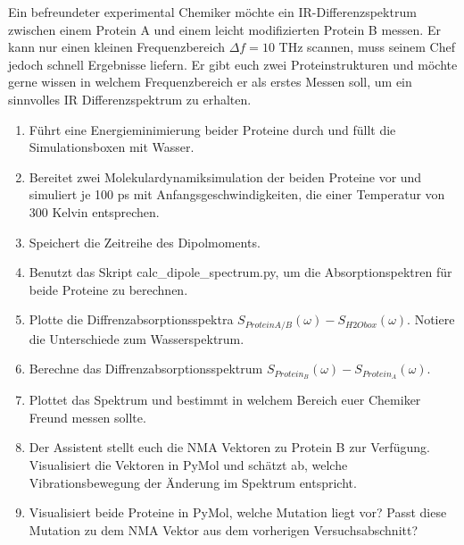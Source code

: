 \documentclass[a4paper,12pt]{article}
\begin{document}
Ein befreundeter experimental Chemiker möchte ein IR-Differenzspektrum zwischen einem Protein A und einem leicht modifizierten Protein B messen. Er
kann nur einen kleinen Frequenzbereich $\Delta f=10$ THz scannen, muss seinem Chef jedoch schnell Ergebnisse liefern. Er gibt euch zwei Proteinstrukturen und möchte 
gerne wissen in welchem Frequenzbereich er als erstes Messen soll, um ein sinnvolles IR Differenzspektrum zu erhalten.
\begin{enumerate}
 \item Führt eine Energieminimierung beider Proteine durch und füllt die Simulationsboxen mit Wasser.
 \item Bereitet zwei Molekulardynamiksimulation der beiden Proteine vor und simuliert je 100 ps mit Anfangsgeschwindigkeiten, die einer Temperatur von 300 Kelvin entsprechen.
 \item Speichert die Zeitreihe des Dipolmoments. 
 \item Benutzt das Skript calc\_dipole\_spectrum.py, um die Absorptionspektren für beide Proteine zu berechnen.
 \item Plotte die Diffrenzabsorptionsspektra $S_{ProteinA/B}(\omega)-S_{H2Obox}(\omega)$. Notiere die Unterschiede zum Wasserspektrum.
 \item Berechne das Diffrenzabsorptionsspektrum $S_{Protein_B}(\omega)-S_{Protein_A}(\omega)$. 
 \item Plottet das Spektrum und bestimmt in welchem Bereich euer Chemiker Freund messen sollte.
 \item Der Assistent stellt euch die NMA Vektoren zu Protein B zur Verfügung. Visualisiert die Vektoren in PyMol und schätzt ab, welche Vibrationsbewegung der Änderung im Spektrum entspricht.
 \item Visualisiert beide Proteine in PyMol, welche Mutation liegt vor? Passt diese Mutation zu dem NMA Vektor aus dem vorherigen Versuchsabschnitt?
\end{enumerate}


\pagebreak
\end{document}
